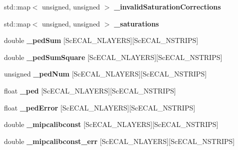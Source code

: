 \begin{DoxyCompactItemize}
\item 
std\-::map$<$ unsigned, unsigned $>$ {\bfseries \-\_\-invalid\-Saturation\-Corrections}\label{classCALICE_1_1IntegratedScECALCalibrationProcessor_a14bbf47f43ebe5e33683b1d47ef4b45d}

\item 
std\-::map$<$ unsigned, unsigned $>$ {\bfseries \-\_\-saturations}\label{classCALICE_1_1IntegratedScECALCalibrationProcessor_ac6a2ff79eb4fab82925e36edae58d22a}

\item 
double {\bfseries \-\_\-ped\-Sum} [Sc\-E\-C\-A\-L\-\_\-\-N\-L\-A\-Y\-E\-R\-S][Sc\-E\-C\-A\-L\-\_\-\-N\-S\-T\-R\-I\-P\-S]\label{classCALICE_1_1IntegratedScECALCalibrationProcessor_a09e83cb1d46116f9bddd9f5f8259758e}

\item 
double {\bfseries \-\_\-ped\-Sum\-Square} [Sc\-E\-C\-A\-L\-\_\-\-N\-L\-A\-Y\-E\-R\-S][Sc\-E\-C\-A\-L\-\_\-\-N\-S\-T\-R\-I\-P\-S]\label{classCALICE_1_1IntegratedScECALCalibrationProcessor_a22ca651c37cdca77e318183ac28d124b}

\item 
unsigned {\bfseries \-\_\-ped\-Num} [Sc\-E\-C\-A\-L\-\_\-\-N\-L\-A\-Y\-E\-R\-S][Sc\-E\-C\-A\-L\-\_\-\-N\-S\-T\-R\-I\-P\-S]\label{classCALICE_1_1IntegratedScECALCalibrationProcessor_adaa3b48097f3a56add3a9dbaaac9d288}

\item 
float {\bfseries \-\_\-ped} [Sc\-E\-C\-A\-L\-\_\-\-N\-L\-A\-Y\-E\-R\-S][Sc\-E\-C\-A\-L\-\_\-\-N\-S\-T\-R\-I\-P\-S]\label{classCALICE_1_1IntegratedScECALCalibrationProcessor_a9d86971a1ebd696affd4df5702f84d93}

\item 
float {\bfseries \-\_\-ped\-Error} [Sc\-E\-C\-A\-L\-\_\-\-N\-L\-A\-Y\-E\-R\-S][Sc\-E\-C\-A\-L\-\_\-\-N\-S\-T\-R\-I\-P\-S]\label{classCALICE_1_1IntegratedScECALCalibrationProcessor_ada246c89a647be0ab4b33365e461a0c2}

\item 
double {\bfseries \-\_\-mipcalibconst} [Sc\-E\-C\-A\-L\-\_\-\-N\-L\-A\-Y\-E\-R\-S][Sc\-E\-C\-A\-L\-\_\-\-N\-S\-T\-R\-I\-P\-S]\label{classCALICE_1_1IntegratedScECALCalibrationProcessor_acf61619680c7df4ffab1cf1a759b6f92}

\item 
double {\bfseries \-\_\-mipcalibconst\-\_\-err} [Sc\-E\-C\-A\-L\-\_\-\-N\-L\-A\-Y\-E\-R\-S][Sc\-E\-C\-A\-L\-\_\-\-N\-S\-T\-R\-I\-P\-S]\label{classCALICE_1_1IntegratedScECALCalibrationProcessor_a1fe73446252d0efa3e77523e2c645b1a}


\end{DoxyCompactItemize}
